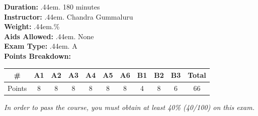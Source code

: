\documentclass[12pt]{article}
\makeatletter
\newcommand\cdotfill{%
    \leavevmode\cleaders\hb@xt@.44em{\hss$.$\hss}\hfill\kern\z@
}
\makeatother
\begin{document}
\noindent \textbf{Duration:}\cdotfill {180 minutes}\\
\textbf{Instructor:}\cdotfill Chandra Gummaluru\\
\textbf{Weight:}\cdotfill 40\% \\
\textbf{Aids Allowed:} \cdotfill None \\
\textbf{Exam Type:} \cdotfill A \\
\textbf{Points Breakdown:}
\begin{table}[H]
    \centering
    \begin{tabular}{|c|c|c|c|c|c|c|c|c|c|c|}
        \hline
          \# & A1 & A2 & A3 & A4 & A5 & A6 & B1 & B2 & B3 & Total  \\\hline
          Points & 8 & 8 & 8 & 8 & 8 & 8 & 4 & 8 & 6 & 66  \\ \hline  
    \end{tabular}
\end{table}
\begin{center}
    \textit{In order to pass the course, you must obtain at least 40\% (40/100) on this exam.}
\end{center}

\clearpage

\end{document}
